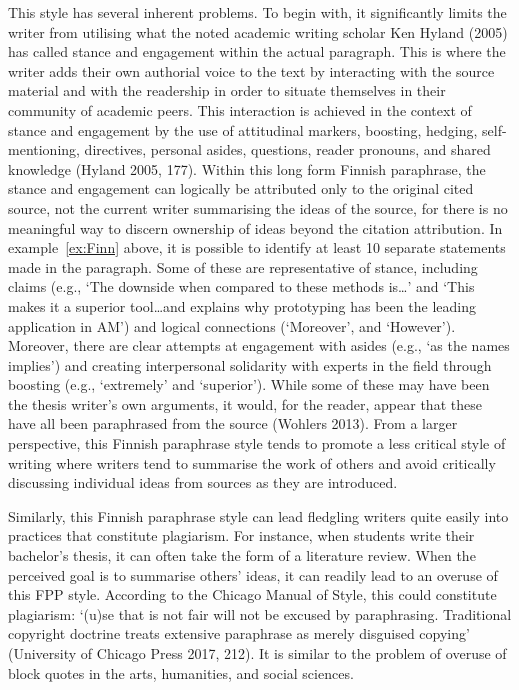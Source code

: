 \documentclass[english, 12pt, a4paper, sci, utf8, a-2b, online]{aaltothesis}
\begin{document}
\vspace{1em}
This style has several inherent problems. To begin with, it significantly limits
the writer from utilising what the noted academic writing scholar Ken Hyland 
(2005) has called stance and engagement within the actual paragraph. This is 
where the writer adds their own authorial voice to the text by interacting with 
the source material and with the readership in order to situate themselves in 
their community of academic peers. This interaction is achieved in the context 
of stance and engagement by the use of attitudinal markers, boosting, hedging, 
self-mentioning, directives, personal asides, questions, reader pronouns, and 
shared knowledge (Hyland 2005, 177). Within this long form Finnish paraphrase, 
the stance and engagement can logically be attributed only to the original cited
source, not the current writer summarising the ideas of the source, for there is
no meaningful way to discern ownership of ideas beyond the citation attribution.
In example~\ref{ex:Finn} above, it is possible to identify at least 10 separate 
statements made in the paragraph. Some of these are representative of stance, 
including claims (e.g., ‘The downside when compared to these methods is\ldots’ 
and ‘This makes it a superior tool\ldots and explains why prototyping has been 
the leading application in AM’) and logical connections (‘Moreover’, and 
‘However’). Moreover, there are clear attempts at engagement with asides (e.g., 
‘as the names implies’) and creating interpersonal solidarity with experts in 
the field through boosting (e.g., ‘extremely’ and ‘superior’). While some of 
these may have been the thesis writer’s own arguments, it would, for the reader,
appear that these have all been paraphrased from the source (Wohlers 2013). From
a larger perspective, this Finnish paraphrase style tends to promote a less 
critical style of writing where writers tend to summarise the work of others and
avoid critically discussing individual ideas from sources as they are 
introduced.

Similarly, this Finnish paraphrase style can lead fledgling writers quite easily
into practices that constitute plagiarism. For instance, when students write 
their bachelor’s thesis, it can often take the form of a literature review. When 
the perceived goal is to summarise others’ ideas, it can readily lead to an 
overuse of this FPP style. According to the Chicago Manual of Style, this could 
constitute plagiarism: ‘(u)se that is not fair will not be excused by 
paraphrasing. Traditional copyright doctrine treats extensive paraphrase as 
merely disguised copying’ (University of Chicago Press 2017, 212). It is similar
to the problem of overuse of block quotes in the arts, humanities, and social 
sciences.
\end{document}
